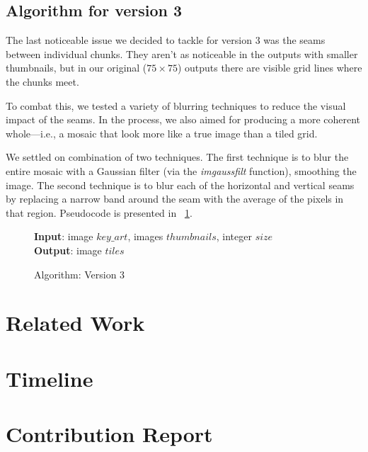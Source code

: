 \documentclass[11pt,conference]{IEEEtran}
\begin{document}
\subsection{Algorithm for version 3}\label{S:algv3}

The last noticeable issue we decided to tackle for version 3 was the seams
between individual chunks. They aren't as noticeable in the outputs with smaller
thumbnails, but in our original (\(75 \times 75\)) outputs there are visible
grid lines where the chunks meet.

To combat this, we tested a variety of blurring techniques to reduce the visual
impact of the seams. In the process, we also aimed for producing a more coherent
whole---i.e., a mosaic that look more like a true image than a tiled grid.

We settled on combination of two techniques. The first technique is to blur the
entire mosaic with a Gaussian filter (via the \textit{imgaussfilt} function),
smoothing the image. The second technique is to blur each of the horizontal and
vertical seams by replacing a narrow band around the seam with the average of
the pixels in that region. Pseudocode is presented in \figurename~\ref{alg:v3}.

\begin{figure}[!t]
    \textbf{Input}: image \(key\_art\), images \(thumbnails\), integer \(size\) \\
    \textbf{Output}: image \(tiles\)
    \begin{algorithmic}
        \STATE{}
        \STATE{}
        \ENDFOR
        \ENDFOR
    \end{algorithmic}
    \caption{Algorithm: Version 3}\label{alg:v3}
\end{figure}

\section{Related Work}

\section{Timeline}

\section{Contribution Report}

{\printbibliography}
\end{document}
